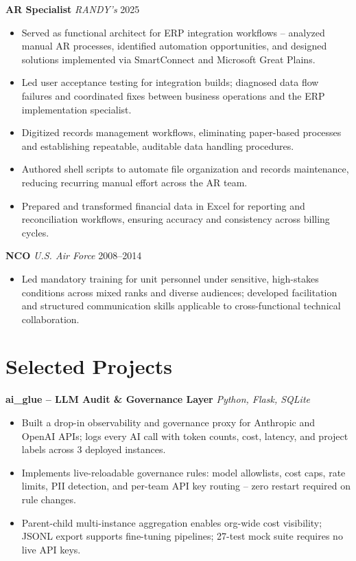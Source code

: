 \documentclass[11pt,a4paper]{article}
\begin{document}
\textbf{AR Specialist} \hfill \textit{RANDY's} \hfill 2025
\begin{itemize}
  \item Served as functional architect for ERP integration workflows -- analyzed manual AR processes,
        identified automation opportunities, and designed solutions implemented via SmartConnect
        and Microsoft Great Plains.
  \item Led user acceptance testing for integration builds; diagnosed data flow failures and
        coordinated fixes between business operations and the ERP implementation specialist.
  \item Digitized records management workflows, eliminating paper-based processes and establishing
        repeatable, auditable data handling procedures.
  \item Authored shell scripts to automate file organization and records maintenance, reducing
        recurring manual effort across the AR team.
  \item Prepared and transformed financial data in Excel for reporting and reconciliation workflows,
        ensuring accuracy and consistency across billing cycles.
\end{itemize}

\vspace{0.4em}
\textbf{NCO} \hfill \textit{U.S. Air Force} \hfill 2008--2014
\begin{itemize}
  \item Led mandatory training for unit personnel under sensitive, high-stakes conditions across
        mixed ranks and diverse audiences; developed facilitation and structured communication skills
        applicable to cross-functional technical collaboration.
\end{itemize}

\section*{Selected Projects}

\textbf{ai\_glue -- LLM Audit \& Governance Layer} \hfill \textit{Python, Flask, SQLite}
\begin{itemize}
  \item Built a drop-in observability and governance proxy for Anthropic and OpenAI APIs; logs every
        AI call with token counts, cost, latency, and project labels across 3 deployed instances.
  \item Implements live-reloadable governance rules: model allowlists, cost caps, rate limits, PII
        detection, and per-team API key routing -- zero restart required on rule changes.
  \item Parent-child multi-instance aggregation enables org-wide cost visibility; JSONL export
        supports fine-tuning pipelines; 27-test mock suite requires no live API keys.
\end{itemize}
\end{document}

